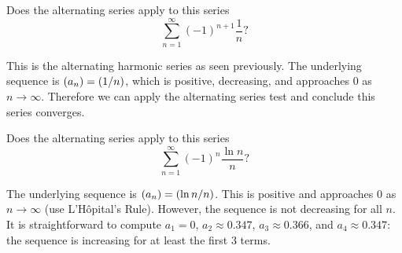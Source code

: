 \documentclass{ximera}
\begin{document}

\begin{question}
  Does the alternating series apply to this series
  \[
  \sum_{n=1}^\infty (-1)^{n+1}\frac1n ?
  \]
  \begin{prompt}
    \begin{multipleChoice}
    \end{multipleChoice}
    \begin{feedback}
      This is the alternating harmonic series as seen previously. The
      underlying sequence is $\left( a_n \right) = \left( 1/n \right)$, which is
      positive, decreasing, and approaches 0 as
      $n\to\infty$. Therefore we can apply the alternating series test
      and conclude this series converges.
      
    \end{feedback}
  \end{prompt}
  \begin{question}
    Does the alternating series apply to this series
    \[
    \sum_{n=1}^\infty (-1)^n\frac{\ln n}{n}?
    \]
    \begin{prompt}
      \begin{multipleChoice}
      \end{multipleChoice}
      \begin{feedback}
        The underlying sequence is $\left( a_n \right) = \left( \ln n/n \right)$. This
        is positive and approaches $0$ as $n\to\infty$ (use
        L'H\^opital's Rule). However, the sequence is not decreasing
        for all $n$. It is straightforward to compute $a_1=0$,
        $a_2\approx0.347$, $a_3\approx 0.366$, and $a_4\approx 0.347$:
        the sequence is increasing for at least the first $3$ terms.
      

\end{feedback}
\end{prompt}
\end{question}
\end{question}
\end{document}
